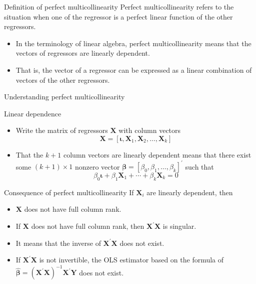 \documentclass[presentation,10pt]{beamer}
\begin{document}
\begin{frame}[label={sec:orgc078d53}]{Definition of perfect multicollinearity}
\alert{Perfect multicollinearity} refers to the situation when one of the
regressor is a perfect linear function of the other regressors.
\begin{itemize}
\item In the terminology of linear algebra, perfect multicollinearity
means that the vectors of regressors are linearly dependent.
\item That is, the vector of a regressor can be expressed as a linear
combination of vectors of the other regressors.
\end{itemize}
\end{frame}

\begin{frame}[label={sec:org541c2dc}]{Understanding perfect multicollinearity}
\begin{block}{Linear dependence}
\begin{itemize}
\item Write the matrix of regressors \(\mathbf{X}\) with column vectors
\[
  \mathbf{X} = [\boldsymbol{\iota}, \boldsymbol{X}_1, \boldsymbol{X}_2, \ldots, \boldsymbol{X}_k ]
  \]
\item That the \(k+1\) column vectors are linearly dependent means that there
exist some \((k+1) \times 1\) nonzero vector \(\boldsymbol{\beta} =
  [\beta_0, \beta_1, \ldots, \beta_k]^{\prime}\) such that
\[
  \beta_0 \boldsymbol{\iota} + \beta_1 \boldsymbol{X}_1 + \cdots + \beta_k
  \boldsymbol{X}_k = 0
  \]
\end{itemize}
\end{block}
\end{frame}

\begin{frame}[label={sec:orgf0f665d}]{Consequence of perfect multicollinearity}
If \(\boldsymbol{X}_i\) are linearly dependent, then
\begin{itemize}
\item \(\mathbf{X}\) does not have full column rank.
\item If \(\mathbf{X}\) does not have full column rank, then
\(\mathbf{X}^{\prime} \mathbf{X}\) is singular.
\item It means that the inverse
of \(\mathbf{X}^{\prime} \mathbf{X}\) does not exist.
\item If \(\mathbf{X}^{\prime} \mathbf{X}\) is not invertible, the OLS
estimator based on the formula of \(\boldsymbol{\hat{\beta}} =
  (\mathbf{X}^{\prime} \mathbf{X})^{-1} \mathbf{X}^{\prime}
  \mathbf{Y}\) does not exist.
\end{itemize}
\end{frame}
\end{document}
